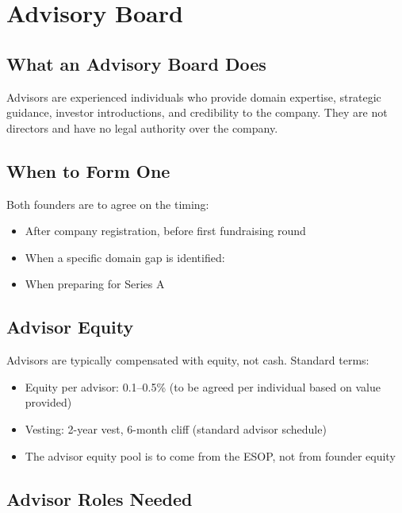 \documentclass[12pt,a4paper]{article}
\newcommand{\blank}[1][5.5cm]{\underline{\hspace{#1}}}
\newcommand{\cb}{$\square$\;}                   %
\begin{document}
\section{Advisory Board}

\subsection{What an Advisory Board Does}

Advisors are experienced individuals who provide domain expertise, strategic guidance, investor introductions, and credibility to the company. They are not directors and have no legal authority over the company.

\subsection{When to Form One}

Both founders are to agree on the timing:

\begin{itemize}[label=\cb]
  \item After company registration, before first fundraising round
  \item When a specific domain gap is identified: \blank[5cm]
  \item When preparing for Series A
\end{itemize}

\subsection{Advisor Equity}

Advisors are typically compensated with equity, not cash. Standard terms:

\begin{itemize}
  \item Equity per advisor: 0.1--0.5\% (to be agreed per individual based on value provided)
  \item Vesting: 2-year vest, 6-month cliff (standard advisor schedule)
  \item The advisor equity pool is to come from the ESOP, not from founder equity
\end{itemize}

\subsection{Advisor Roles Needed}
\end{document}
